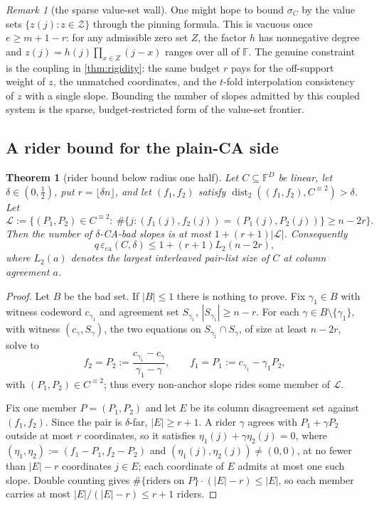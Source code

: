 \documentclass[11pt]{amsart}
\newtheorem{theorem}{Theorem}[section]
\theoremstyle{definition}
\theoremstyle{remark}
\newtheorem{remark}[remark]{Remark}
\newcommand{\F}{\mathbb{F}}
\newcommand{\dist}{\operatorname{dist}}
\newcommand{\eca}{\varepsilon_{\mathrm{ca}}}
\begin{document}
\begin{remark}[the sparse value-set wall]\label{rem:valuewall}
One might hope to bound $\sigma_C$ by the value sets $\{z(j):z\in\mathcal Z\}$ through the pinning formula.  This is vacuous once $e\ge m+1-r$: for any admissible zero set $Z$, the factor $h$ has nonnegative degree and $z(j)=h(j)\prod_{x\in Z}(j-x)$ ranges over all of $\F$.  The genuine constraint is the coupling in \cref{thm:rigidity}: the same budget $r$ pays for the off-support weight of $z$, the unmatched coordinates, and the $t$-fold interpolation consistency of $z$ with a single slope.  Bounding the number of slopes admitted by this coupled system is the sparse, budget-restricted form of the value-set frontier.
\end{remark}

\subsection{A rider bound for the plain-CA side}

\begin{theorem}[rider bound below radius one half]\label{thm:rider}
Let $C\subseteq\F^D$ be linear, let $\delta\in(0,\tfrac12)$, put $r=\lfloor\delta n\rfloor$, and let $(f_1,f_2)$ satisfy $\dist_2((f_1,f_2),C^{\equiv2})>\delta$.  Let
\[
        \mathcal L:=\{(P_1,P_2)\in C^{\equiv2}:\ \#\{j:(f_1(j),f_2(j))=(P_1(j),P_2(j))\}\ge n-2r\}.
\]
Then the number of $\delta$-CA-bad slopes is at most $1+(r+1)|\mathcal L|$.  Consequently
\[
        q\,\eca(C,\delta)\le1+(r+1)L_2(n-2r),
\]
where $L_2(a)$ denotes the largest interleaved pair-list size of $C$ at column agreement $a$.
\end{theorem}

\begin{proof}
Let $B$ be the bad set.  If $|B|\le1$ there is nothing to prove.  Fix $\gamma_1\in B$ with witness codeword $c_{\gamma_1}$ and agreement set $S_{\gamma_1}$, $|S_{\gamma_1}|\ge n-r$.  For each $\gamma\in B\setminus\{\gamma_1\}$, with witness $(c_\gamma,S_\gamma)$, the two equations on $S_{\gamma_1}\cap S_\gamma$, of size at least $n-2r$, solve to
\[
        f_2=P_2:=\frac{c_{\gamma_1}-c_\gamma}{\gamma_1-\gamma},
        \qquad
        f_1=P_1:=c_{\gamma_1}-\gamma_1P_2,
\]
with $(P_1,P_2)\in C^{\equiv2}$; thus every non-anchor slope rides some member of $\mathcal L$.

Fix one member $P=(P_1,P_2)$ and let $E$ be its column disagreement set against $(f_1,f_2)$.  Since the pair is $\delta$-far, $|E|\ge r+1$.  A rider $\gamma$ agrees with $P_1+\gamma P_2$ outside at most $r$ coordinates, so it satisfies $\eta_1(j)+\gamma\eta_2(j)=0$, where $(\eta_1,\eta_2):=(f_1-P_1,f_2-P_2)$ and $(\eta_1(j),\eta_2(j))\ne(0,0)$, at no fewer than $|E|-r$ coordinates $j\in E$; each coordinate of $E$ admits at most one such slope.  Double counting gives $\#\{\text{riders on }P\}\cdot(|E|-r)\le |E|$, so each member carries at most $|E|/(|E|-r)\le r+1$ riders.
\end{proof}
\end{document}
